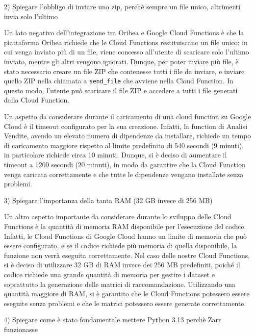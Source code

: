 2) Spiegare l'obbligo di inviare uno zip, perchè sempre un file unico, altrimenti invia solo l'ultimo

Un lato negativo dell'integrazione tra Oribea e Google Cloud Functions è che la piattaforma Oribea richiede che le Cloud Functions restituiscano un file unico: in cui venga inviato più di un file, viene concesso all'utente di scaricare solo l'ultimo inviato, mentre gli altri vengono ignorati. Dunque, per poter inviare più file, è stato necessario creare un file ZIP che contenesse tutti i file da inviare, e inviare quello ZIP nella chiamata a \texttt{send\_file} che avviene nella Cloud Function. In questo modo, l'utente può scaricare il file ZIP e accedere a tutti i file generati dalla Cloud Function.

Un aspetto da considerare durante il caricamento di una cloud function su Google Cloud è il timeout configurato per la sua creazione. Infatti, la function di Analisi Vendite, avendo un elevato numero di dipendenze da installare, richiede un tempo di caricamento maggiore rispetto al limite predefinito di 540 secondi (9 minuti), in particolare richiede circa 10 minuti. Dunque, si è deciso di aumentare il timeout a 1200 secondi (20 minuti), in modo da garantire che la Cloud Function venga caricata correttamente e che tutte le dipendenze vengano installate senza problemi.

3) Spiegare l'importanza della tanta RAM (32 GB invece di 256 MB)

Un altro aspetto importante da considerare durante lo sviluppo delle Cloud Functions è la quantità di memoria RAM disponibile per l'esecuzione del codice. Infatti, le Cloud Functions di Google Cloud hanno un limite di memoria che può essere configurato, e se il codice richiede più memoria di quella disponibile, la funzione non verrà eseguita correttamente. Nel caso delle nostre Cloud Functions, si è deciso di utilizzare 32 GB di RAM invece dei 256 MB predefiniti, poiché il codice richiede una grande quantità di memoria per gestire i dataset e soprattutto la generazione delle matrici di raccomandazione. Utilizzando una quantità maggiore di RAM, si è garantito che le Cloud Functions potessero essere eseguite senza problemi e che le matrici potessero essere generate correttamente.

4) Spiegare come è stato fondamentale mettere Python 3.13 perchè Zarr funzionasse

